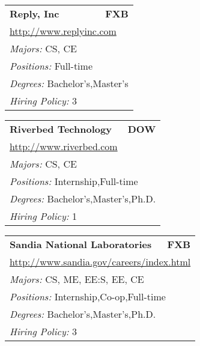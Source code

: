 \documentclass[twoside]{article}
\begin{document}
\begin{center}
\begin{multicols}{3}
\begin{FlushLeft}
\begin{minipage}{\columnwidth}
\end{minipage}
 
\begin{minipage}{\columnwidth}\begin{tabularx}{.95\columnwidth}{Xr}
                 {\Large\bf Reply, Inc} & {\Large\bf FXB}\\
    \multicolumn{2}{p{.95\columnwidth}}{\url{http://www.replyinc.com}}\\
    \multicolumn{2}{p{.95\columnwidth}}{\emph{Majors:} CS, CE}\\
    \multicolumn{2}{p{.95\columnwidth}}{\emph{Positions:} Full-time}\\
    \multicolumn{2}{p{.95\columnwidth}}{\emph{Degrees:} Bachelor's,Master's}\\
    \multicolumn{2}{p{.95\columnwidth}}{\emph{Hiring Policy:} 3}\\
    \end{tabularx}
    
\end{minipage}
 
\begin{minipage}{\columnwidth}\begin{tabularx}{.95\columnwidth}{Xr}
                 {\Large\bf Riverbed Technology} & {\Large\bf DOW}\\
    \multicolumn{2}{p{.95\columnwidth}}{\url{http://www.riverbed.com}}\\
    \multicolumn{2}{p{.95\columnwidth}}{\emph{Majors:} CS, CE}\\
    \multicolumn{2}{p{.95\columnwidth}}{\emph{Positions:} Internship,Full-time}\\
    \multicolumn{2}{p{.95\columnwidth}}{\emph{Degrees:} Bachelor's,Master's,Ph.D.}\\
    \multicolumn{2}{p{.95\columnwidth}}{\emph{Hiring Policy:} 1}\\
    \end{tabularx}
    
\end{minipage}
 
\begin{minipage}{\columnwidth}\begin{tabularx}{.95\columnwidth}{Xr}
                 {\Large\bf Sandia National Laboratories} & {\Large\bf FXB}\\
    \multicolumn{2}{p{.95\columnwidth}}{\url{http://www.sandia.gov/careers/index.html}}\\
    \multicolumn{2}{p{.95\columnwidth}}{\emph{Majors:} CS, ME, EE:S, EE, CE}\\
    \multicolumn{2}{p{.95\columnwidth}}{\emph{Positions:} Internship,Co-op,Full-time}\\
    \multicolumn{2}{p{.95\columnwidth}}{\emph{Degrees:} Bachelor's,Master's,Ph.D.}\\
    \multicolumn{2}{p{.95\columnwidth}}{\emph{Hiring Policy:} 3}\\
    \end{tabularx}
    

\end{minipage}
\end{FlushLeft}
\end{multicols}
\end{center}
\end{document}
